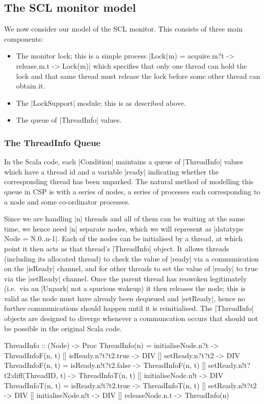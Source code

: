 \subsection{The SCL monitor model}


We now consider our model of the SCL monitor. This consists of three main components:
\begin{itemize}
  \item The monitor lock; this is a simple process |Lock(m) = acquire.m?t -> release.m.t -> Lock(m)| which specifies that only one thread can hold the lock and that same thread must release the lock before some other thread can obtain it.
  \item The |LockSupport| module; this is as described above.
  \item The queue of |ThreadInfo| values.
\end{itemize}

\subsubsection{The ThreadInfo Queue}

In the Scala code, each |Condition| maintains a queue of |ThreadInfo| values which have a thread id and a variable |ready| indicating whether the corresponding thread has been unparked. The natural method of modelling this queue in CSP is with a series of nodes, a series of processes each corresponding to a node and some co-ordinator processes.

Since we are handling |n| threads and all of them can be waiting at the same time, we hence need |n| separate nodes, which we will represent as |datatype Node = N.{0..n-1}|. Each of the nodes can be initialised by a thread, at which point it then acts as that thread's |ThreadInfo| object. It allows threads (including its allocated thread) to check the value of |ready| via a communication on the |isReady| channel, and for other threads to set the value of |ready| to true via the |setReady| channel. Once the parent thread has reawoken legitimately (i.e.~via an |Unpark| not a spurious wakeup) it then releases the node; this is valid as the node must have already been dequeued and |setReady|, hence no further communications should happen until it is reinitialised. The |ThreadInfo| objects are designed to diverge whenever a communcation occurs that should not be possible in the original Scala code.

\begin{cspm}
  ThreadInfo :: (Node) -> Proc
  ThreadInfo(n) = 
       initialiseNode.n?t -> ThreadInfoF(n, t)
    [] isReady.n?t?t2.true -> DIV
    [] setReady.n?t?t2 -> DIV
  ThreadInfoF(n, t) =  
       isReady.n!t?t2.false -> ThreadInfoF(n, t)
    [] setReady.n!t?t2:diff(ThreadID, t) -> ThreadInfoT(n, t)
    [] initialiseNode.n!t -> DIV
  ThreadInfoT(n, t) = 
       isReady.n!t?t2.true -> ThreadInfoT(n, t)
    [] setReady.n!t?t2 -> DIV
    [] initialiseNode.n!t -> DIV
    [] releaseNode.n.t -> ThreadInfo(n)
\end{cspm}


